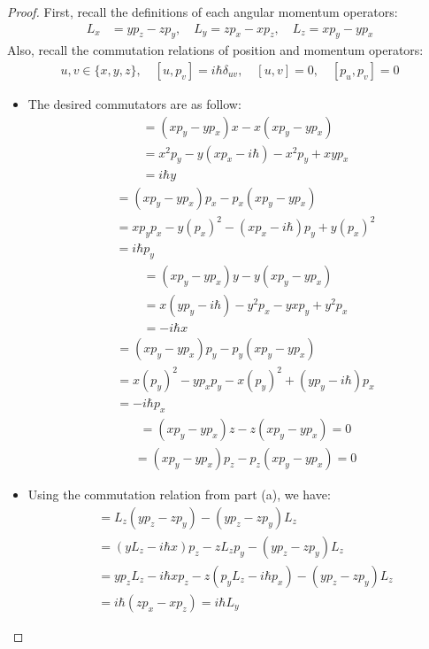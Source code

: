 \documentclass{article}
\begin{document}
\begin{proof}
    First, recall the definitions of each angular momentum operators:
    \begin{align}
        L_x &=yp_z-zp_y,\quad L_y=zp_x-xp_z,\quad L_z=xp_y-yp_x
    \end{align}
    Also, recall the commutation relations of position and momentum operators:
    \begin{align}
        u,v\in \{x,y,z\},\quad [u,p_v]=i\hbar \delta_{uv},\quad [u,v]=0,\quad [p_u,p_v]=0
    \end{align}
    \begin{itemize}
        \item[(a)] The desired commutators are as follow:
        \begin{align}
            [L_z,x] &= (xp_y-yp_x)x - x(xp_y-yp_x) \\
            &= x^2p_y - y(xp_x - i\hbar)-x^2p_y + xy p_x\\
            &= i\hbar y
        \end{align}
        \begin{align}
            [L_z,p_x] &= (xp_y-yp_x)p_x - p_x(xp_y-yp_x)\\
            &= xp_yp_x - y(p_x)^2 - (x p_x-i\hbar)p_y + y (p_x)^2\\
            &= i\hbar p_y
        \end{align}
        \begin{align}
            [L_z,y] &= (xp_y-yp_x)y-y(xp_y-yp_x)\\
            &= x(yp_y - i\hbar) - y^2p_x - yxp_y + y^2p_x\\
            &= -i\hbar x
        \end{align}
        \begin{align}
            [L_z,p_y] &= (xp_y-yp_x)p_y - p_y(xp_y-yp_x)\\
            &= x(p_y)^2 - yp_xp_y - x(p_y)^2 + (yp_y - i\hbar)p_x\\
            &= -i\hbar p_x
        \end{align}
        \begin{align}
            [L_z,z] &= (xp_y-yp_x)z-z(xp_y-yp_x) = 0
        \end{align}
        \begin{align}
            [L_z,p_z] &= (xp_y-yp_x)p_z-p_z(xp_y-yp_x)=0
        \end{align}

        \hfil

        \item[(b)] Using the commutation relation from part (a), we have:
        \begin{align}
            [L_z,L_x] &= L_z(yp_z-zp_y)-(yp_z-zp_y)L_z\\
            &= (yL_z - i\hbar x)p_z - zL_z p_y - (yp_z-zp_y)L_z\\
            &= yp_zL_z - i\hbar xp_z - z(p_yL_z - i\hbar p_x) - (yp_z-zp_y)L_z\\
            &= i\hbar (zp_x - xp_z) = i\hbar L_y
        \end{align}


\end{itemize}
\end{proof}
\end{document}
